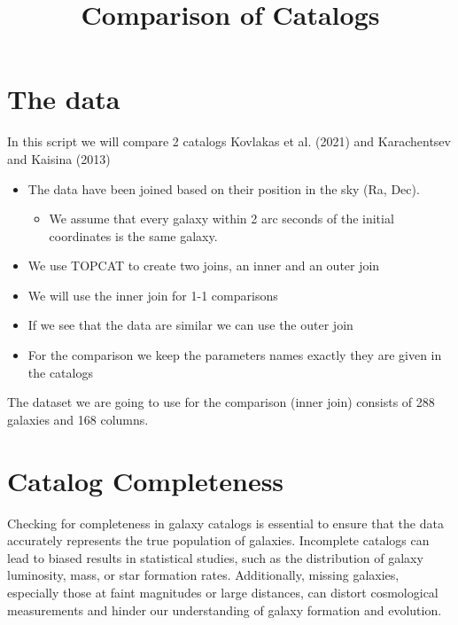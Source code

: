 \documentclass[
]{article}
\title{Comparison of Catalogs}
\author{}
\date{}
\providecommand{\tightlist}{%
  \setlength{\itemsep}{0pt}\setlength{\parskip}{0pt}}\usepackage{longtable,booktabs,array}
\renewcommand*\contentsname{Table of contents}
\newcommand\contentsname{Table of contents}
\begin{document}
\maketitle

\renewcommand*\contentsname{Table of contents}
{
\hypersetup{linkcolor=}
\setcounter{tocdepth}{3}
\tableofcontents
}
\section{The data}\label{the-data}

In this script we will compare 2 catalogs Kovlakas et al. (2021) and
Karachentsev and Kaisina (2013)

\begin{itemize}
\tightlist
\item
  The data have been joined based on their position in the sky (Ra,
  Dec).

  \begin{itemize}
  \tightlist
  \item
    We assume that every galaxy within 2 arc seconds of the initial
    coordinates is the same galaxy.
  \end{itemize}
\item
  We use TOPCAT to create two joins, an inner and an outer join
\item
  We will use the inner join for 1-1 comparisons
\item
  If we see that the data are similar we can use the outer join
\item
  For the comparison we keep the parameters names exactly they are given
  in the catalogs
\end{itemize}

The dataset we are going to use for the comparison (inner join) consists
of 288 galaxies and 168 columns.

\section{Catalog Completeness}\label{catalog-completeness}

Checking for completeness in galaxy catalogs is essential to ensure that
the data accurately represents the true population of galaxies.
Incomplete catalogs can lead to biased results in statistical studies,
such as the distribution of galaxy luminosity, mass, or star formation
rates. Additionally, missing galaxies, especially those at faint
magnitudes or large distances, can distort cosmological measurements and
hinder our understanding of galaxy formation and evolution.
\end{document}
